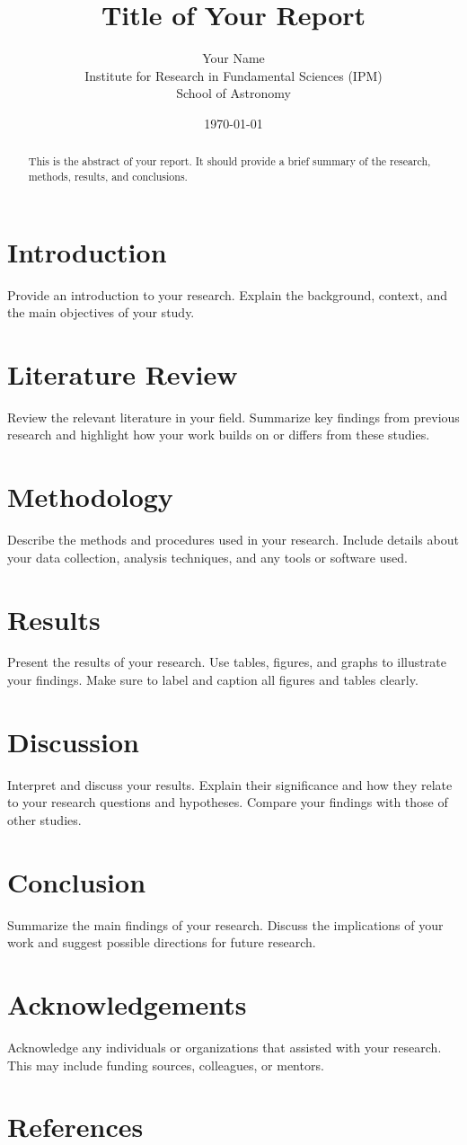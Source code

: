 \documentclass[a4paper, 12pt]{article}
\title{Title of Your Report}
\author{Your Name \\
        Institute for Research in Fundamental Sciences (IPM) \\
        School of Astronomy}
\date{\today}
\begin{document}
\maketitle

\begin{abstract}
    This is the abstract of your report. It should provide a brief summary of the research, methods, results, and conclusions.
\end{abstract}

\tableofcontents
\newpage

\section{Introduction}
Provide an introduction to your research. Explain the background, context, and the main objectives of your study.

\section{Literature Review}
Review the relevant literature in your field. Summarize key findings from previous research and highlight how your work builds on or differs from these studies.

\section{Methodology}
Describe the methods and procedures used in your research. Include details about your data collection, analysis techniques, and any tools or software used.

\section{Results}
Present the results of your research. Use tables, figures, and graphs to illustrate your findings. Make sure to label and caption all figures and tables clearly.

\section{Discussion}
Interpret and discuss your results. Explain their significance and how they relate to your research questions and hypotheses. Compare your findings with those of other studies.

\section{Conclusion}
Summarize the main findings of your research. Discuss the implications of your work and suggest possible directions for future research.

\section{Acknowledgements}
Acknowledge any individuals or organizations that assisted with your research. This may include funding sources, colleagues, or mentors.

\section{References}


\end{document}
